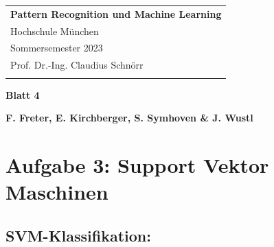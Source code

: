 \documentclass[a4paper,12pt]{article}
\begin{document}
\thispagestyle{empty} 

\begin{tabular}{p{15.5cm}} 
{\large \bf Pattern Recognition und Machine Learning} \\
Hochschule München \\ Sommersemester 2023  \\ Prof. Dr.-Ing. Claudius Schnörr \\
\hline 
\\
\end{tabular} 

\vspace*{0.3cm} 

\begin{center} 
	{\Large \bf Blatt 4} 
	\vspace{2mm}
	

	{\bf F. Freter, E. Kirchberger, S. Symhoven \& J. Wustl} 
		
\end{center}  

\vspace{0.4cm}




\section*{Aufgabe 3: Support Vektor Maschinen}

\subsection*{SVM-Klassifikation:}
\end{document}
